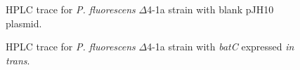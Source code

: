 		\setlength\fboxsep{5pt}
		\setlength\fboxrule{1.5pt}
		\begin{figure}[htbp]
		\centering
		\caption[HPLC trace for \textit{P. fluorescens} $ \Delta $4-1a strain with blank pJH10 plasmid. ]{HPLC trace for \textit{P. fluorescens} $ \Delta $4-1a strain with blank pJH10 plasmid.}
		\label{fig:hplcdelta4phj10}
		\end{figure}

		\setlength\fboxsep{5pt}
		\setlength\fboxrule{1.5pt}
		\begin{figure}[htbp]
		\centering
		\caption[HPLC trace for \textit{P. fluorescens}  $ \Delta $4-1a strain with \textit{batC} expressed \textit{in trans}. ]{HPLC trace for \textit{P. fluorescens}  $ \Delta $4-1a strain with \textit{batC} expressed \textit{in trans}.}
		\label{fig:hplcdelta4batc}
		\end{figure}

\newpage		

